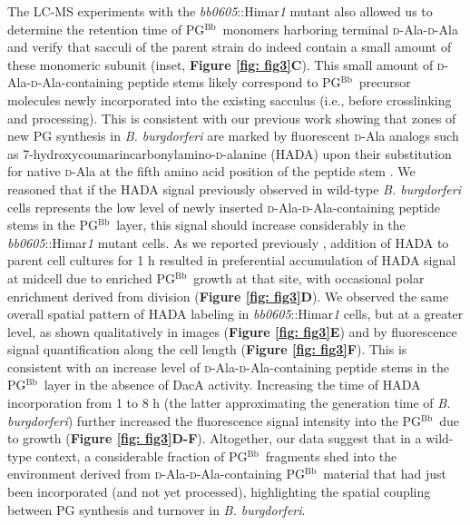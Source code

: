 \documentclass[twoside, watermark]{zHenriquesLab-StyleBioRxiv}
\newcommand{\pgbb}{PG$^\text{Bb}$}
\newcommand{\scd}{\textsc{d}} %
\begin{document}
\vspace{1mm}
The LC-MS experiments with the \textit{bb0605}::Himar\textit{1} mutant also allowed us to determine the retention time of \pgbb~monomers harboring terminal \scd-Ala-\scd-Ala and verify that sacculi of the parent strain do indeed contain a small amount of these monomeric subunit (inset, \textbf{Figure \ref{fig: fig3}C}). This small amount of \scd-Ala-\scd-Ala-containing peptide stems likely correspond to \pgbb~precursor molecules newly incorporated into the existing sacculus (i.e., before crosslinking and processing). This is consistent with our previous work showing that zones of new PG synthesis in \textit{B. burgdorferi} are marked by fluorescent \scd-Ala analogs such as 7-hydroxycoumarincarbonylamino-\scd-alanine (HADA) upon their substitution for native \scd-Ala at the fifth amino acid position of the peptide stem \cite{Jutras2016}. We reasoned that if the HADA signal previously observed in wild-type \textit{B. burgdorferi} cells represents the low level of newly inserted \scd-Ala-\scd-Ala-containing peptide stems in the \pgbb~layer, this signal should increase considerably in the \textit{bb0605}::Himar\textit{1} mutant cells. As we reported previously \cite{Jutras2016}, addition of HADA to parent cell cultures for 1 h resulted in preferential accumulation of HADA signal at midcell due to enriched \pgbb~growth at that site, with occasional polar enrichment derived from division (\textbf{Figure \ref{fig: fig3}D}). We observed the same overall spatial pattern of HADA labeling in \textit{bb0605}::Himar\textit{1} cells, but at a greater level, as shown qualitatively in images (\textbf{Figure \ref{fig: fig3}E}) and by fluorescence signal quantification along the cell length (\textbf{Figure \ref{fig: fig3}F}). This is consistent with an increase level of \scd-Ala-\scd-Ala-containing peptide stems in the \pgbb~layer in the absence of DacA activity. Increasing the time of HADA incorporation from 1 to 8 h (the latter approximating the generation time of \textit{B. burgdorferi}) further increased the fluorescence signal intensity into the \pgbb~due to growth (\textbf{Figure \ref{fig: fig3}D-F}). Altogether, our data suggest that in a wild-type context, a considerable fraction of \pgbb~fragments shed into the environment derived from \scd-Ala-\scd-Ala-containing \pgbb~material that had just been incorporated (and not yet processed), highlighting the spatial coupling between PG synthesis and turnover in \textit{B. burgdorferi}.
\end{document}
